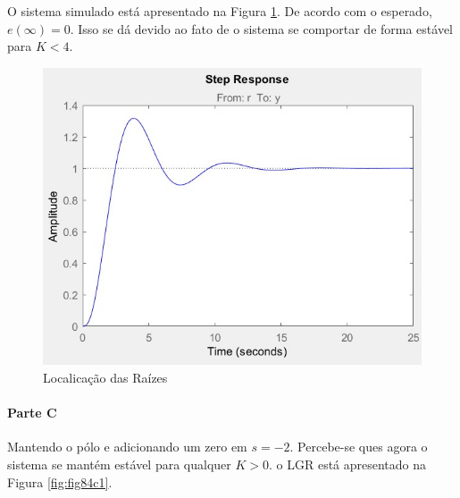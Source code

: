 \documentclass[
]{book}
\theoremstyle{definition}
\theoremstyle{definition}
\theoremstyle{definition}
\theoremstyle{remark}
\begin{document}
O sistema simulado está apresentado na Figura \ref{fig:fig84b1}. De acordo com o esperado, \(e(\infty) = 0\). Isso se dá devido ao fato de o sistema se comportar de forma estável para \(K<4\).

\begin{figure}

{\centering \includegraphics{Imagens/Lab8/Resolução/fig4b1} 

}

\caption{Localicação das Raízes}\label{fig:fig84b1}
\end{figure}

\hypertarget{parte-c-8}{%
\paragraph{Parte C}\label{parte-c-8}}

Mantendo o pólo e adicionando um zero em \(s = -2\). Percebe-se ques agora o sistema se mantém estável para qualquer \(K > 0\). o LGR está apresentado na Figura \ref{fig:fig84c1}.
\end{document}
